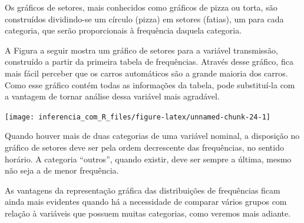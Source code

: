 \documentclass[
]{book}
\newenvironment{Shaded}{\begin{snugshade}}{\end{snugshade}}
\newcommand{\AttributeTok}[1]{\textcolor[rgb]{0.77,0.63,0.00}{#1}}
\newcommand{\DecValTok}[1]{\textcolor[rgb]{0.00,0.00,0.81}{#1}}
\newcommand{\FunctionTok}[1]{\textcolor[rgb]{0.00,0.00,0.00}{#1}}
\newcommand{\NormalTok}[1]{#1}
\newcommand{\OtherTok}[1]{\textcolor[rgb]{0.56,0.35,0.01}{#1}}
\newcommand{\SpecialCharTok}[1]{\textcolor[rgb]{0.00,0.00,0.00}{#1}}
\newcommand{\StringTok}[1]{\textcolor[rgb]{0.31,0.60,0.02}{#1}}
\begin{document}
Os gráficos de setores, mais conhecidos como gráficos de pizza ou torta, são construídos dividindo-se um círculo (pizza) em setores (fatias), um para cada categoria, que serão proporcionais à frequência daquela categoria.

A Figura a seguir mostra um gráfico de setores para a variável transmissão, construído a partir da primeira tabela de frequências. Através desse gráfico, fica mais fácil perceber que os carros automáticos são a grande maioria dos carros. Como esse gráfico contém todas as informações da tabela, pode substituí-la com a vantagem de tornar análise dessa variável mais agradável.

\begin{Shaded}
\end{Shaded}

\begin{center}\texttt{[image: inferencia\_com\_R\_files/figure-latex/unnamed-chunk-24-1]} \end{center}

Quando houver mais de duas categorias de uma variável nominal, a disposição no gráfico de setores deve ser pela ordem decrescente das frequências, no sentido horário. A categoria ``outros'', quando existir, deve ser sempre a última, mesmo não seja a de menor frequência.

As vantagens da representação gráfica das distribuições de frequências ficam ainda mais evidentes quando há a necessidade de comparar vários grupos com relação à variáveis que possuem muitas categorias, como veremos mais adiante.
\end{document}
